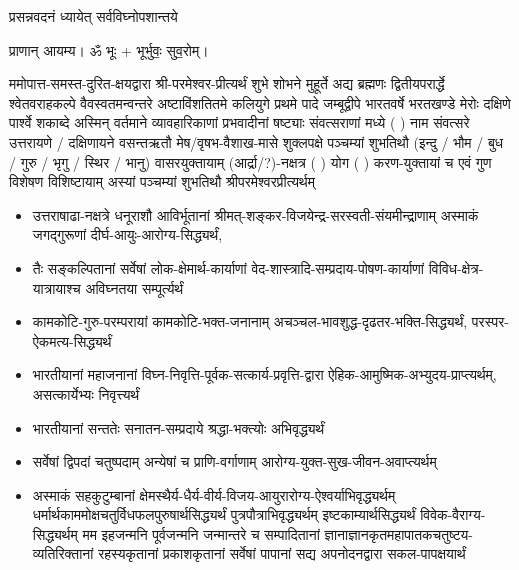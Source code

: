 
\setlength{\parindent}{0pt}




{प्रसन्नवदनं ध्यायेत् सर्वविघ्नोपशान्तये}
 
प्राणान्  आयम्य।  ॐ भूः + भूर्भुवः॒ सुव॒रोम्।


ममोपात्त-समस्त-दुरित-क्षयद्वारा श्री-परमेश्वर-प्रीत्यर्थं शुभे शोभने मुहूर्ते अद्य ब्रह्मणः
द्वितीयपरार्द्धे श्वेतवराहकल्पे वैवस्वतमन्वन्तरे अष्टाविंशतितमे कलियुगे प्रथमे पादे
जम्बूद्वीपे भारतवर्षे भरतखण्डे मेरोः दक्षिणे पार्श्वे शकाब्दे अस्मिन् वर्तमाने व्यावहारिकाणां प्रभवादीनां षष्ट्याः संवत्सराणां मध्ये (	) नाम संवत्सरे उत्तरायणे / दक्षिणायने 
वसन्तऋतौ  मेष/वृषभ-वैशाख-मासे शुक्लपक्षे पञ्चम्यां शुभतिथौ
(इन्दु / भौम / बुध / गुरु / भृगु / स्थिर / भानु) वासरयुक्तायाम्
(आर्द्रा/?)-नक्षत्र (  ) योग  (  ) करण-युक्तायां च एवं गुण विशेषण विशिष्टायाम्
अस्यां पञ्चम्यां  
शुभतिथौ श्रीपरमेश्वरप्रीत्यर्थम्

\begin{itemize}
\item उत्तराषाढा-नक्षत्रे धनूराशौ आविर्भू\-तानां श्रीमत्-शङ्कर-विजयेन्द्र-सरस्वती-संयमीन्द्राणाम् अस्माकं जगद्गुरूणां दीर्घ-आयुः-आरोग्य-सिद्ध्यर्थं,

\item तैः सङ्कल्पितानां सर्वेषां लोक-क्षेमार्थ-कार्याणां वेद-शास्त्रादि-सम्प्रदाय-पोषण-कार्याणां विविध-क्षेत्र-यात्रायाश्च अविघ्नतया सम्पूर्त्यर्थं

\item कामकोटि-गुरु-परम्परायां कामकोटि-भक्त-जनानाम् अचञ्चल-भावशुद्ध-दृढतर-भक्ति-सिद्ध्यर्थं, परस्पर-ऐकमत्य-सिद्ध्यर्थं

\item भारतीयानां महाजनानां विघ्न-निवृत्ति-पूर्वक-सत्कार्य-प्रवृत्ति-द्वारा ऐहिक-आमुष्मिक-अभ्युदय-प्राप्त्यर्थम्, असत्कार्येभ्यः निवृत्त्यर्थं

\item भारतीयानां सन्ततेः सनातन-सम्प्रदाये श्रद्धा-भक्त्योः अभिवृद्ध्यर्थं

\item सर्वेषां द्विपदां चतुष्पदाम् अन्येषां च प्राणि-वर्गाणाम् आरोग्य-युक्त-सुख-जीवन-अवाप्त्यर्थम्

\item अस्माकं सहकुटुम्बानां क्षेमस्थैर्य-धैर्य-वीर्य-विजय-आयुरारोग्य-ऐश्वर्याभिवृद्ध्यर्थम्
 धर्मार्थकाममोक्ष\-चतुर्विधफलपुरुषार्थसिद्ध्यर्थं पुत्रपौत्राभि\-वृद्ध्यर्थम् इष्टकाम्यार्थसिद्ध्यर्थं विवेक-वैराग्य-सिद्ध्यर्थम्
मम इहजन्मनि पूर्वजन्मनि जन्मान्तरे च सम्पादितानां ज्ञानाज्ञानकृतमहा\-पातकचतुष्टय-व्यतिरिक्तानां रहस्यकृतानां प्रकाशकृतानां सर्वेषां पापानां सद्य अपनोदनद्वारा सकल-पापक्षयार्थं 

\end{itemize}

